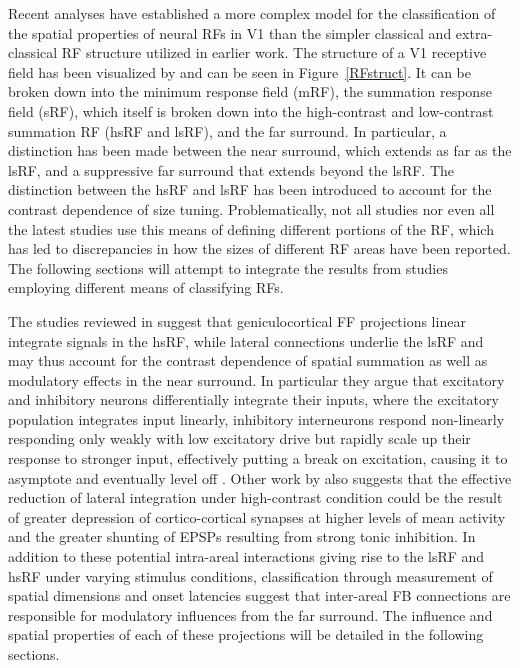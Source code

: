 Recent analyses have established a more complex model for the
classification of the spatial properties of neural RFs in V1 than the
simpler classical and extra-classical RF structure utilized in earlier
work. The structure of a V1 receptive field has been visualized by
\cite{Angelucci2006a} and can be seen in Figure~\ref{RFstruct}. It can
be broken down into the minimum response field (mRF), the summation
response field (sRF), which itself is broken down into the
high-contrast and low-contrast summation RF (hsRF and lsRF), and the
far surround. In particular, a distinction has been made between the
near surround, which extends as far as the lsRF, and a suppressive far
surround that extends beyond the lsRF. The distinction between the
hsRF and lsRF has been introduced to account for the contrast
dependence of size tuning. Problematically, not all studies nor even
all the latest studies use this means of defining different portions
of the RF, which has led to discrepancies in how the sizes of
different RF areas have been reported. The following sections will
attempt to integrate the results from studies employing different
means of classifying RFs.

The studies reviewed in \cite{Angelucci2006a} suggest that
geniculocortical FF projections linear integrate signals in the hsRF,
while lateral connections underlie the lsRF and may thus account for
the contrast dependence of spatial summation as well as modulatory
effects in the near surround. In particular they argue that excitatory
and inhibitory neurons differentially integrate their inputs, where
the excitatory population integrates input linearly, inhibitory
interneurons respond non-linearly responding only weakly with low
excitatory drive but rapidly scale up their response to stronger
input, effectively putting a break on excitation, causing it to
asymptote and eventually level off \citep{Angelucci2002}. Other work
by \cite{Sceniak1999} also suggests that the effective reduction of
lateral integration under high-contrast condition could be the result
of greater depression of cortico-cortical synapses at higher levels of
mean activity and the greater shunting of EPSPs resulting from strong
tonic inhibition. In addition to these potential intra-areal
interactions giving rise to the lsRF and hsRF under varying stimulus
conditions, classification through measurement of spatial dimensions
and onset latencies suggest that inter-areal FB connections are
responsible for modulatory influences from the far surround. The
influence and spatial properties of each of these projections will be
detailed in the following sections.


